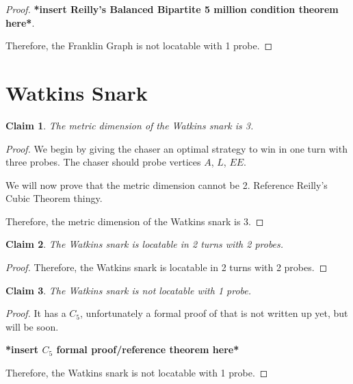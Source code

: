 \documentclass[11pt]{article}
\newtheorem{clm}{Claim}
\begin{document}
	\begin{proof}
		\textbf{*insert Reilly's Balanced Bipartite 5 million condition theorem here*}.
		
		Therefore, the Franklin Graph is not locatable with 1 probe.
	\end{proof}
	\newpage
	
	\section{Watkins Snark}
	\begin{clm}
		The metric dimension of the Watkins snark is 3.
	\end{clm}
	\begin{proof}
		We begin by giving the chaser an optimal strategy to win in one turn with three probes. The chaser should probe vertices $A$, $L$, $EE$.
		
		We will now prove that the metric dimension cannot be 2. Reference Reilly's Cubic Theorem thingy.
		
		Therefore, the metric dimension of the Watkins snark is 3.
	\end{proof}
	\begin{clm}
		The Watkins snark is locatable in 2 turns with 2 probes.
	\end{clm}
	\begin{proof}
		Therefore, the Watkins snark is locatable in 2 turns with 2 probes.
	\end{proof}
	\begin{clm}
		The Watkins snark is not locatable with 1 probe.
	\end{clm}
	\begin{proof}
		It has a $C_5$, unfortunately a formal proof of that is not written up yet, but will be soon.
		
		\textbf{*insert $C_5$ formal proof/reference theorem here*}
		
		Therefore, the Watkins snark is not locatable with 1 probe.
	\end{proof}
\end{document}

